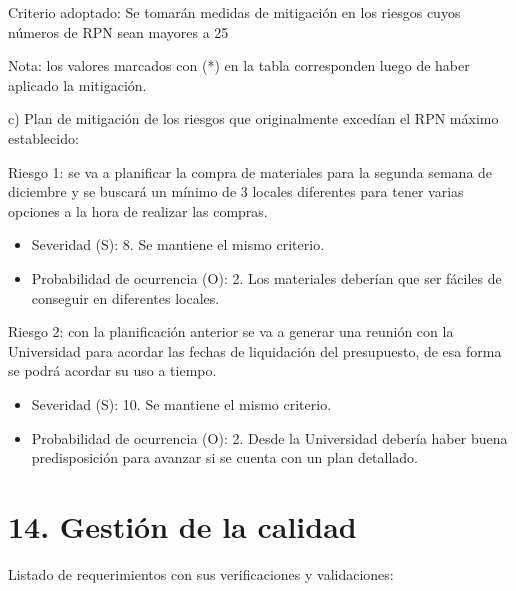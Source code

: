 \documentclass[
11pt, %
codirector, %
]{charter}
\begin{document}
Criterio adoptado: 
Se tomarán medidas de mitigación en los riesgos cuyos números de RPN sean mayores a 25

Nota: los valores marcados con (*) en la tabla corresponden luego de haber aplicado la mitigación.

c) Plan de mitigación de los riesgos que originalmente excedían el RPN máximo establecido:
 
Riesgo 1: se va a planificar la compra de materiales para la segunda semana de diciembre y se buscará un mínimo de 3 locales diferentes para tener varias opciones a la hora de realizar las compras.
\begin{itemize}
	\item Severidad (S): 8. Se mantiene el mismo criterio.
	\item Probabilidad de ocurrencia (O): 2. Los materiales deberían que ser fáciles de conseguir en diferentes locales.
\end{itemize}
Riesgo 2: con la planificación anterior se va a generar una reunión con la Universidad para acordar las fechas de liquidación del presupuesto, de esa forma se podrá acordar su uso a tiempo.
\begin{itemize}
	\item Severidad (S): 10. Se mantiene el mismo criterio.
	\item Probabilidad de ocurrencia (O): 2. Desde la Universidad debería haber buena predisposición para avanzar si se cuenta con un plan detallado.
\end{itemize}

\section{14. Gestión de la calidad}
\label{sec:calidad}

Listado de requerimientos con sus verificaciones y validaciones:
\end{document}
